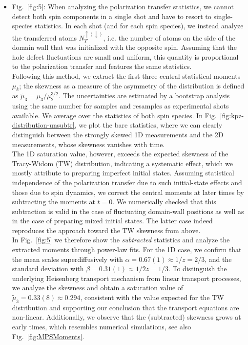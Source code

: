 \documentclass[
 reprint,
 superscriptaddress,
 amsmath,amssymb,
 aps,
 pra,
]{revtex4-2}
\begin{document}
\begin{itemize}
    \item Fig.~\ref{fig:5}: When analyzing the polarization transfer statistics, we cannot detect both spin components in a single shot and have to resort to single-species statistics. In each shot (and for each spin species), we instead analyze the transferred atoms $N_T^{\uparrow (\downarrow)}$, i.e. the number of atoms on the side of the domain wall that was initialized with the opposite spin. Assuming that the hole defect fluctuations are small and uniform, this quantity is proportional to the polarization transfer and features the same statistics.\\
    Following this method, we extract the first three central statistical moments $\mu_k$; the skewness as a measure of the asymmetry of the distribution is defined as $\tilde{\mu}_3 = \mu_3 / \mu_2^{3/2}$. The uncertainties are estimated by a bootstrap analysis using the same number for samples and resamples as experimental shots available. We average over the statistics of both spin species. In Fig.~\ref{fig:kpz-distribution-unsubtr}, we plot the bare statistics, where we can clearly distinguish between the strongly skewed 1D measurements and the 2D measurements, whose skewness vanishes with time.\\
    The 1D saturation value, however, exceeds the expected skewness of the Tracy-Widom (TW) distribution, indicating a systematic effect, which we mostly attribute to preparing imperfect initial states. Assuming statistical independence of the polarization transfer due to such initial-state effects and those due to spin dynamics, we correct the central moments at later times by subtracting the moments at $t=0$. We numerically checked that this subtraction is valid in the case of fluctuating domain-wall positions as well as in the case of preparing mixed initial states. The latter case indeed reproduces the approach toward the TW skewness from above.\\
    In Fig.~\ref{fig:5} we therefore show the \emph{subtracted} statistics and analyze the extracted moments through power-law fits. For the 1D case, we confirm that the mean scales superdiffusively with $\alpha = 0.67(1) \approx 1/z = 2/3$, and the standard deviation with $\beta = 0.31(1) \approx 1 / 2z = 1/3$. To distinguish the underlying Heisenberg transport mechanism from linear transport processes, we analyze the skewness and obtain a saturation value of $\tilde{\mu}_3 = 0.33(8) \approx 0.294$, consistent with the value expected for the TW distribution and supporting our conclusion that the transport equations are non-linear. Additionally, we observe that the (subtracted) skewness grows at early times, which resembles numerical simulations, see also Fig.~\ref{fig:MPSMoments}.
\end{itemize}
\end{document}
